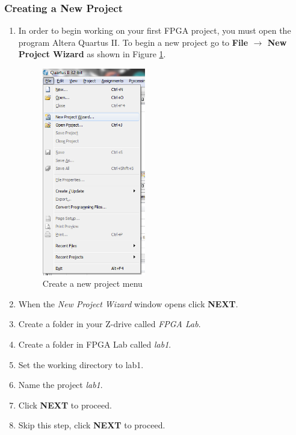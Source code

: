 \subsubsection{Creating a New Project}
\begin{enumerate}
	\item In order to begin working on your first FPGA project, you must open the program Altera Quartus II. To begin a new project go to  {\bf File $\rightarrow$ New Project Wizard} as shown in Figure \ref{fig:step1}.

	\begin{figure}[H]
		\centering
		\includegraphics[width=45mm]{Lab1/figures/step1.png}
		\caption{Create a new project menu}
		\label{fig:step1}
	\end{figure}

	\item When the \emph{New Project Wizard} window opens click {\bf NEXT}.

	\item Create a folder in your Z-drive called \emph{FPGA Lab}.

	\item Create a folder in FPGA Lab called \emph{lab1}.

	\item Set the working directory to lab1.

	\item Name the project \emph{lab1}.

	\item Click {\bf NEXT} to proceed.

	\item Skip this step, click  {\bf NEXT} to proceed.


\end{enumerate}
